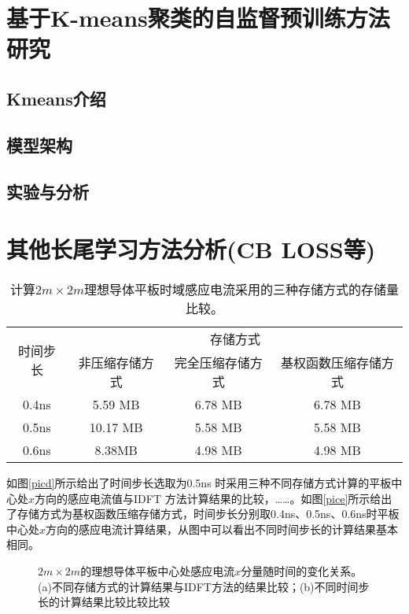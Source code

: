 \documentclass[master]{thesis-uestc}
\begin{document}
\chapter{基于K-means聚类的自监督预训练方法研究}
\section{Kmeans介绍}
\section{模型架构}
\section{实验与分析}

\chapter{其他长尾学习方法分析(CB LOSS等)}

\begin{table}[h]
\caption{计算$2m\times 2m$理想导体平板时域感应电流采用的三种存储方式的存储量比较。}
\begin{tabular}{cccc}
\toprule
\multirow{2}{*}{时间步长} & \multicolumn{3}{c}{存储方式} \\
\cmidrule{2-4}
& 非压缩存储方式 & 完全压缩存储方式 & 基权函数压缩存储方式 \\
\midrule
0.4ns & 5.59 MB & 6.78 MB & 6.78 MB\\
0.5ns & 10.17 MB & 5.58 MB & 5.58 MB \\
0.6ns & 8.38MB & 4.98 MB & 4.98 MB \\
\bottomrule
\end{tabular}
\label{tablea}
\end{table}

如图\ref{picd}所示给出了时间步长选取为0.5ns 时采用三种不同存储方式计算的平板中心处$x$方向的感应电流值与IDFT 方法计算结果的比较，……。如图\ref{pice}所示给出了存储方式为基权函数压缩存储方式，时间步长分别取0.4ns、0.5ns、0.6ns时平板中心处$x$方向的感应电流计算结果，从图中可以看出不同时间步长的计算结果基本相同。

\begin{figure}[h]
\caption{$2m\times 2m$的理想导体平板中心处感应电流$x$分量随时间的变化关系。(a)不同存储方式的计算结果与IDFT方法的结果比较；(b)不同时间步长的计算结果比较比较比较}
\label{fig2}
\end{figure}
\end{document}
